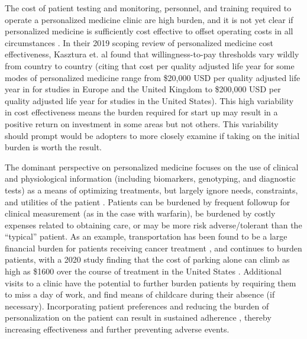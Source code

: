 The cost of patient testing and monitoring, personnel, and training  required to operate a personalized medicine clinic are high burden, and it is not yet clear if personalized medicine is sufficiently cost effective to offset operating costs in all circumstances \cite{kasztura2019cost}.  In their 2019 scoping review of personalized medicine cost effectiveness, Kasztura et. al \cite{kasztura2019cost} found that willingness-to-pay thresholds vary wildly from country to country (citing that cost per quality adjusted life year for some modes of personalized medicine range from \$20,000 USD per quality adjusted life year in for studies in Europe and the United Kingdom to \$200,000 USD per quality adjusted life year for studies in the United States).  This high variability in cost effectiveness means the burden required for start up may result in a positive return on investment in some areas but not others. This variability should prompt would be adopters to more closely examine if taking on the initial burden is worth the result.

The dominant perspective on personalized medicine focuses on the use of clinical and physiological information (including biomarkers, genotyping, and diagnostic tests) as a means of optimizing treatments, but largely ignore needs, constraints, and utilities of the patient \cite{rogowski2015concepts, di2017personalized}. Patients can be burdened by frequent followup for clinical measurement (as in the case with warfarin), be burdened by costly expenses related to obtaining care, or may be more risk adverse/tolerant than the ``typical'' patient. As an example, transportation has been found to be a large financial burden for patients receiving cancer treatment \cite{houts1984nonmedical}, and continues to burden patients, with a 2020 study finding that the cost of parking alone can climb as high as \$1600 over the course of treatment in the United States \cite{lee2020assessment}.  Additional visits to a clinic have the potential to further burden patients by requiring them to miss a day of work, and find means of childcare during their absence (if necessary). Incorporating patient preferences and reducing the burden of personalization on the patient can result in sustained adherence \cite{elliott2008understanding}, thereby increasing effectiveness and further preventing adverse events.


